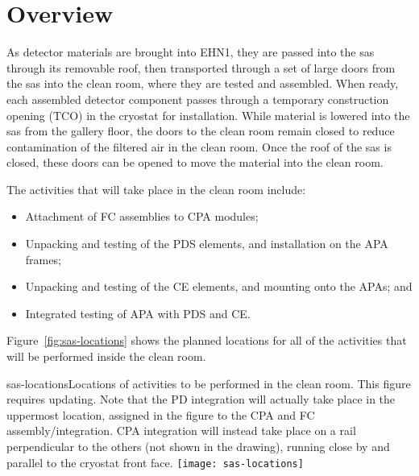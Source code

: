 

\section{Overview}

As detector materials are brought into EHN1, they are passed into the sas through its removable roof, then transported through a set of large doors from the sas into the clean room, where they are tested and assembled. When ready, each assembled detector component passes through a temporary construction opening (TCO) in the cryostat for installation.
While material is lowered into the sas from the gallery floor, the doors to the clean room remain closed to reduce contamination of the filtered air in the clean room.
Once the roof of the sas is closed, these doors can be opened to move the material into the clean room. 

The activities that will take place in the clean room include:
\begin{itemize}
\item Attachment of FC assemblies to CPA modules;
\item Unpacking and testing of the PDS elements, and installation on the APA frames;
\item Unpacking and testing of the CE elements, and mounting onto the APAs; and  
\item Integrated testing of APA with PDS and CE.  
\end{itemize}
 Figure~\ref{fig:sas-locations} shows the planned locations for all of the activities that will be performed inside the clean room.  

\begin{cdrfigure}{sas-locations}{Locations of activities to be performed in the clean room. This figure requires updating. Note that the PD integration will actually take place in the uppermost location, assigned in the figure to the CPA and FC assembly/integration. CPA integration will instead take place on a rail perpendicular to the others (not shown in the drawing), running close by and parallel to the cryostat front face.}
\texttt{[image: sas-locations]}
\end{cdrfigure}

